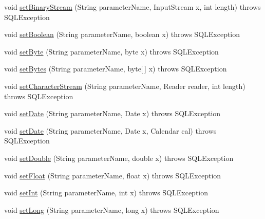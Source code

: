 \begin{DoxyCompactItemize}
\item 
void \mbox{\hyperlink{classcom_1_1mysql_1_1cj_1_1jdbc_1_1_callable_statement_a2cb01ff3839a5512f641ad8ffc72adaa}{set\+Binary\+Stream}} (String parameter\+Name, Input\+Stream x, int length)  throws S\+Q\+L\+Exception 
\item 
void \mbox{\hyperlink{classcom_1_1mysql_1_1cj_1_1jdbc_1_1_callable_statement_a8236f80a9a498f1401ee0f2ec01adcdd}{set\+Boolean}} (String parameter\+Name, boolean x)  throws S\+Q\+L\+Exception 
\item 
void \mbox{\hyperlink{classcom_1_1mysql_1_1cj_1_1jdbc_1_1_callable_statement_a212a0900b99fd7f7ddbe7a64eea6b1e4}{set\+Byte}} (String parameter\+Name, byte x)  throws S\+Q\+L\+Exception 
\item 
void \mbox{\hyperlink{classcom_1_1mysql_1_1cj_1_1jdbc_1_1_callable_statement_aaa52a01483a9d999e9c8973064a063d9}{set\+Bytes}} (String parameter\+Name, byte\mbox{[}$\,$\mbox{]} x)  throws S\+Q\+L\+Exception 
\item 
void \mbox{\hyperlink{classcom_1_1mysql_1_1cj_1_1jdbc_1_1_callable_statement_ae67b3fc2ec48f545359e93d6568ccc3b}{set\+Character\+Stream}} (String parameter\+Name, Reader reader, int length)  throws S\+Q\+L\+Exception 
\item 
void \mbox{\hyperlink{classcom_1_1mysql_1_1cj_1_1jdbc_1_1_callable_statement_ad8945fa51e3fbb56c41cea11624e726e}{set\+Date}} (String parameter\+Name, Date x)  throws S\+Q\+L\+Exception 
\item 
void \mbox{\hyperlink{classcom_1_1mysql_1_1cj_1_1jdbc_1_1_callable_statement_a4acf89e04d11195ab7c45dce46e7c367}{set\+Date}} (String parameter\+Name, Date x, Calendar cal)  throws S\+Q\+L\+Exception 
\item 
void \mbox{\hyperlink{classcom_1_1mysql_1_1cj_1_1jdbc_1_1_callable_statement_abd5c1f562e6a0f06c4ef239a208d1471}{set\+Double}} (String parameter\+Name, double x)  throws S\+Q\+L\+Exception 
\item 
void \mbox{\hyperlink{classcom_1_1mysql_1_1cj_1_1jdbc_1_1_callable_statement_a419e74b589c54323627a2dbace2148c9}{set\+Float}} (String parameter\+Name, float x)  throws S\+Q\+L\+Exception 
\item 
void \mbox{\hyperlink{classcom_1_1mysql_1_1cj_1_1jdbc_1_1_callable_statement_a7b7f13ec6ca2fe9dc40472b5334d1259}{set\+Int}} (String parameter\+Name, int x)  throws S\+Q\+L\+Exception 
\item 
void \mbox{\hyperlink{classcom_1_1mysql_1_1cj_1_1jdbc_1_1_callable_statement_a1b79292eddc7df78b2ef1b7e9ea614ed}{set\+Long}} (String parameter\+Name, long x)  throws S\+Q\+L\+Exception 

\end{DoxyCompactItemize}
